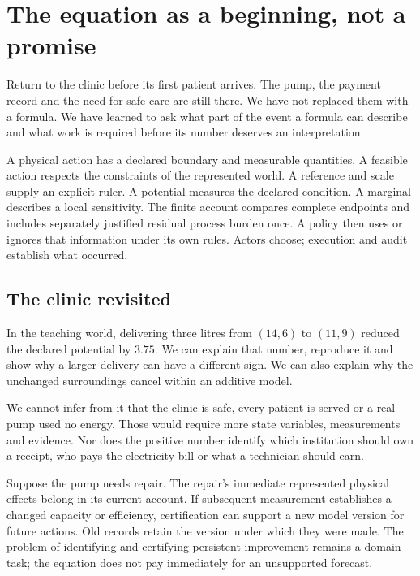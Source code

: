 \chapter{The equation as a beginning, not a promise}\label{ch:beginning}

Return to the clinic before its first patient arrives. The pump, the payment record and the need for safe care are still there. We have not replaced them with a formula. We have learned to ask what part of the event a formula can describe and what work is required before its number deserves an interpretation.

A physical action has a declared boundary and measurable quantities. A feasible action respects the constraints of the represented world. A reference and scale supply an explicit ruler. A potential measures the declared condition. A marginal describes a local sensitivity. The finite account compares complete endpoints and includes separately justified residual process burden once. A policy then uses or ignores that information under its own rules. Actors choose; execution and audit establish what occurred.

\section{The clinic revisited}
In the teaching world, delivering three litres from $(14,6)$ to $(11,9)$ reduced the declared potential by $3.75$. We can explain that number, reproduce it and show why a larger delivery can have a different sign. We can also explain why the unchanged surroundings cancel within an additive model.

We cannot infer from it that the clinic is safe, every patient is served or a real pump used no energy. Those would require more state variables, measurements and evidence. Nor does the positive number identify which institution should own a receipt, who pays the electricity bill or what a technician should earn.

Suppose the pump needs repair. The repair's immediate represented physical effects belong in its current account. If subsequent measurement establishes a changed capacity or efficiency, certification can support a new model version for future actions. Old records retain the version under which they were made. The problem of identifying and certifying persistent improvement remains a domain task; the equation does not pay immediately for an unsupported forecast.

